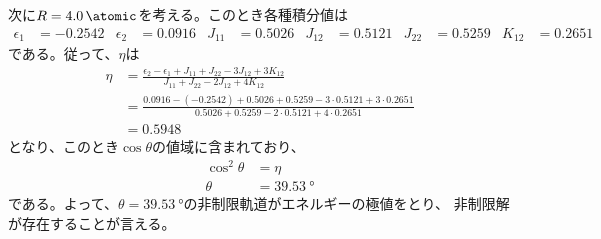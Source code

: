 次に$R=\SI{4.0}{\atomic}$を考える。このとき各種積分値は
\begin{align}
	\epsilon_1
&=
	-0.2542 &
%
	\epsilon_2
&=
	0.0916 &
%
	J_{11}
&=
	0.5026 &
%
	J_{12}
&=
	0.5121 &
%
	J_{22}
&=
	0.5259 &
%
	K_{12}
&=
	0.2651
\end{align}
である。従って、$\eta$は
\begin{align}
	\eta
&=
	\frac{
		\epsilon_2 -\epsilon_1
		+J_{11} +J_{22} -3J_{12} +3K_{12}
	}{
		J_{11} +J_{22} -2J_{12} +4K_{12}
	} \\
%
%
&=
	\frac{
		0.0916 -(-0.2542)
		+0.5026 +0.5259 -3\cdot0.5121 +3\cdot0.2651
	}{
		0.5026 +0.5259 -2\cdot0.5121 +4\cdot0.2651
	} \\
%
%
&=
	0.5948
\end{align}
となり、このとき$\cos\theta$の値域に含まれており、
\begin{align}
	\cos^2\theta
&=
	\eta \\
%
%
	\theta
&=
	\SI{39.53}{\degree}
\end{align}
である。よって、$\theta=\SI{39.53}{\degree}$の非制限軌道がエネルギーの極値をとり、
非制限解が存在することが言える。



